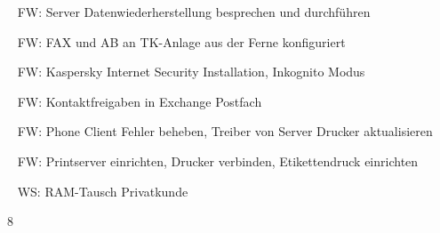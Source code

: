 {{	\textbullet~ FW: Server Datenwiederherstellung besprechen und durchführen\par
	\textbullet~ FW: FAX und AB an TK-Anlage aus der Ferne konfiguriert\par
	\textbullet~ FW: Kaspersky Internet Security Installation, Inkognito Modus\par
	\textbullet~ FW: Kontaktfreigaben in Exchange Postfach\par
	\textbullet~ FW: Phone Client Fehler beheben, Treiber von Server Drucker aktualisieren\par
	\textbullet~ FW: Printserver einrichten, Drucker verbinden, Etikettendruck einrichten\par
	\textbullet~ WS: RAM-Tausch Privatkunde
	}{}{8}
}{}
\Unterschrift
\newpage
